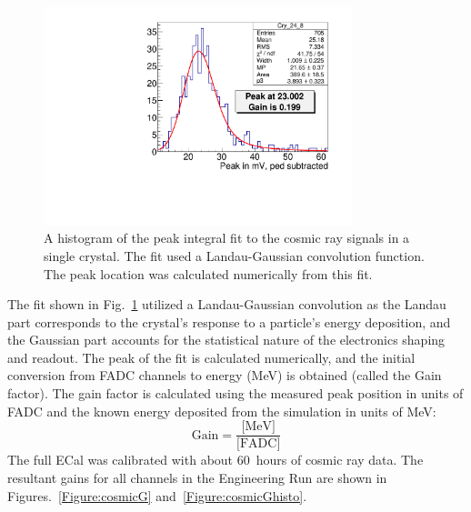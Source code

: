 \begin{figure}[htb]
  \centering
      \includegraphics[width=0.8\textwidth]{pics/performance/cosmicFitExample2015.pdf}
  \caption[Integrated cosmic signal in ECal fitted for calibration]{A histogram of the peak integral fit to the cosmic ray signals in a single crystal. The fit used a Landau-Gaussian convolution function. The peak location was calculated numerically from this fit.}
  \label{Figure:cosmicFit}
\end{figure}

The fit shown in Fig.~\ref{Figure:cosmicFit} utilized a Landau-Gaussian convolution as the Landau part corresponds to the crystal's response to a particle's energy deposition, and the Gaussian part accounts for the statistical nature of the electronics shaping and readout. The peak of the fit is calculated numerically, and the initial conversion from FADC channels to energy (MeV) is obtained (called the Gain factor). The gain factor is calculated using the measured peak position in units of FADC and the known energy deposited from the simulation in units of MeV:
\begin{equation}
	\label{eq:gain}
	\textrm{Gain} = \dfrac{\textrm{[MeV]}}{\textrm{[FADC]}} 
\end{equation}
The full ECal was calibrated with about 60~hours of cosmic ray data. The resultant gains for all channels in the Engineering Run are shown in Figures.~\ref{Figure:cosmicG} and~\ref{Figure:cosmicGhisto}.

